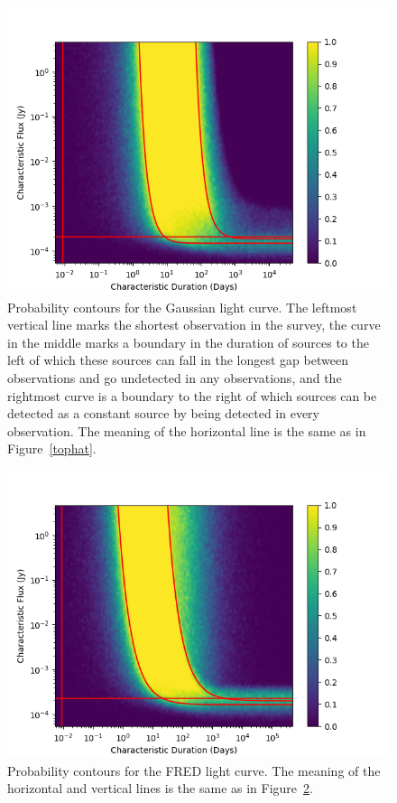 \documentclass[12pt]{article}
\begin{document}
\begin{figure}
\label{parabolic}
 \end{figure} \begin{figure}
\includegraphics[width=\columnwidth]{gaussian.png}
\caption{Probability contours for the Gaussian light curve. The leftmost vertical line marks the shortest observation in the survey, the curve in the middle marks a boundary in the duration of sources to the left of which these sources can fall in the longest gap between observations and go undetected in any observations, and the rightmost curve is a boundary to the right of which sources can be detected as a constant source by being detected in every observation. The meaning of the horizontal line is the same as in Figure~\ref{tophat}.}
\label{gaussian}
 \end{figure}\begin{figure}
\includegraphics[width=\columnwidth]{fred.png}
\caption{Probability contours for the FRED light curve. The meaning of the horizontal and vertical lines is the same as in Figure~\ref{gaussian}.}
\label{fred}
 \end{figure}
 
\end{document}

